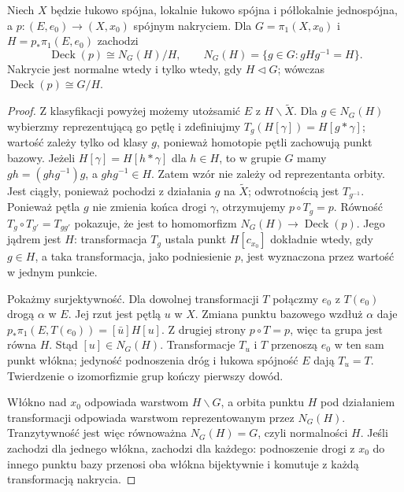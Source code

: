 \begin{twierdzenie}
\label{thm:deck-normalizator}
Niech $X$ będzie łukowo spójna, lokalnie łukowo spójna
i półlokalnie jednospójna, a $p:(E,e_0)\to(X,x_0)$
spójnym nakryciem. Dla
$G=\pi_1(X,x_0)$ i $H=p_*\pi_1(E,e_0)$ zachodzi
\[
 \operatorname{Deck}(p)\cong N_G(H)/H,
 \qquad N_G(H)=\{g\in G:gHg^{-1}=H\}.
\]
Nakrycie jest normalne wtedy i tylko wtedy, gdy
$H\mathrel{\triangleleft}G$; wówczas
$\operatorname{Deck}(p)\cong G/H$.
\end{twierdzenie}
\begin{proof}
Z klasyfikacji powyżej możemy utożsamić $E$
z $H\backslash\widetilde X$. Dla $g\in N_G(H)$
wybierzmy reprezentującą go pętlę i zdefiniujmy
$T_g(H[\gamma])=H[g*\gamma]$; wartość zależy tylko
od klasy $g$, ponieważ homotopie pętli zachowują
punkt bazowy.
Jeżeli $H[\gamma]=H[h*\gamma]$ dla $h\in H$,
to w grupie $G$ mamy $gh=(ghg^{-1})g$,
a $ghg^{-1}\in H$.
Zatem wzór nie zależy od reprezentanta orbity.
Jest ciągły, ponieważ pochodzi z działania $g$
na $\widetilde X$; odwrotnością jest $T_{g^{-1}}$.
Ponieważ pętla $g$ nie zmienia końca drogi $\gamma$,
otrzymujemy $p\circ T_g=p$. Równość
$T_g\circ T_{g'}=T_{gg'}$ pokazuje, że jest to
homomorfizm $N_G(H)\to\operatorname{Deck}(p)$.
Jego jądrem jest $H$: transformacja $T_g$
ustala punkt $H[c_{x_0}]$ dokładnie wtedy, gdy $g\in H$,
a taka transformacja, jako podniesienie $p$,
jest wyznaczona przez wartość w jednym punkcie.

Pokażmy surjektywność. Dla dowolnej transformacji $T$
połączmy $e_0$ z $T(e_0)$ drogą $\alpha$ w $E$.
Jej rzut jest pętlą $u$ w $X$. Zmiana punktu bazowego
wzdłuż $\alpha$ daje
$p_*\pi_1(E,T(e_0))=[\bar u]H[u]$.
Z drugiej strony $p\circ T=p$, więc ta grupa jest równa $H$.
Stąd $[u]\in N_G(H)$. Transformacje $T_u$ i $T$
przenoszą $e_0$ w ten sam punkt włókna; jedyność
podnoszenia dróg i łukowa spójność $E$ dają $T_u=T$.
Twierdzenie o izomorfizmie grup kończy pierwszy dowód.

Włókno nad $x_0$ odpowiada warstwom $H\backslash G$,
a orbita punktu $H$ pod działaniem transformacji
odpowiada warstwom reprezentowanym przez $N_G(H)$.
Tranzytywność jest więc równoważna $N_G(H)=G$, czyli
normalności $H$. Jeśli zachodzi dla jednego włókna,
zachodzi dla każdego: podnoszenie drogi z $x_0$ do
innego punktu bazy przenosi oba włókna bijektywnie
i komutuje z każdą transformacją nakrycia.
\end{proof}

